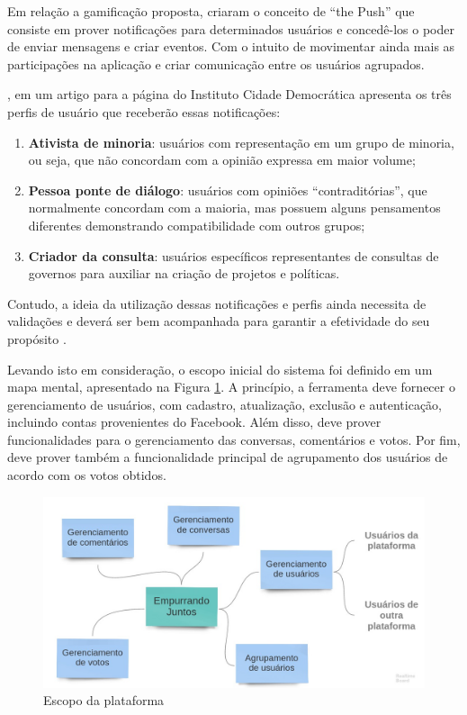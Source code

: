 Em relação a gamificação proposta,  criaram o conceito de ``the Push'' que consiste
em prover notificações para determinados usuários e concedê-los o poder de enviar mensagens e criar eventos. Com 
o intuito de movimentar ainda mais as participações na aplicação e criar comunicação entre os usuários agrupados.

, em um artigo para a página do Instituto Cidade Democrática apresenta os três perfis de usuário
que receberão essas notificações:

\begin{enumerate}
  \item \textbf{Ativista de minoria}: usuários com representação em um grupo de minoria, ou seja, que não concordam com a opinião 
    expressa em maior volume;
  \item \textbf{Pessoa ponte de diálogo}: usuários com opiniões ``contraditórias'', que normalmente concordam com a maioria, mas
    possuem alguns pensamentos diferentes demonstrando compatibilidade com outros grupos;
  \item \textbf{Criador da consulta}: usuários específicos representantes de consultas de governos para auxiliar na criação de projetos
  e políticas.
\end{enumerate}


Contudo, a ideia da utilização dessas notificações e perfis ainda necessita de validações e deverá ser bem
acompanhada para garantir a efetividade do seu propósito \cite{empurrandojuntos, parra}. 

Levando isto em consideração, o escopo inicial do sistema foi definido em um mapa mental, apresentado na Figura \ref{fig:mapa_mental_ej}. 
A princípio, a ferramenta deve fornecer o gerenciamento de usuários, com cadastro, atualização, exclusão e autenticação, 
incluindo contas provenientes do Facebook. Além disso, deve prover funcionalidades para o gerenciamento das conversas, comentários
e votos. Por fim, deve prover também a funcionalidade principal de agrupamento dos usuários de acordo com os votos obtidos.

\begin{figure}[h!]
\centering
\includegraphics[scale=0.35]{figuras/mapa_mental_ej.jpg}
\caption{Escopo da plataforma}
\label{fig:mapa_mental_ej}
\end{figure}

